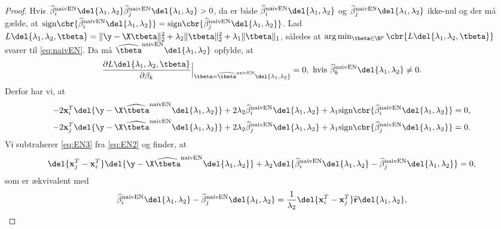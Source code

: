 %
\begin{proof}
Hvis \(\widehat{\beta}^\text{naivEN}_i \del{\lambda_1, \lambda_2} \widehat{\beta}^\text{naivEN}_j \del{\lambda_1, \lambda_2} > 0\), da er både \(\widehat{\beta}^\text{naivEN}_i \del{\lambda_1, \lambda_2}\) og \(\widehat{\beta}^\text{naivEN}_j \del{\lambda_1, \lambda_2}\) ikke-nul og der må gælde, at \(\text{sign} \cbr{\widehat{\beta}^\text{naivEN}_i \del{\lambda_1, \lambda_2}} = \text{sign} \cbr{\widehat{\beta}^\text{naivEN}_j \del{\lambda_1, \lambda_2}}\).
Lad \(L \del{\lambda_1,\lambda_2, \tbeta} = \Vert \y - \X \tbeta \Vert_2^2 + \lambda_2 \Vert \tbeta \Vert_2^2 + \lambda_1 \Vert \tbeta \Vert_1\), således at \(\arg \min_{\tbeta \in \R^p} \cbr{L \del{\lambda_1,\lambda_2, \tbeta}}\) svarer til \eqref{eq:naivEN}.
Da må \(\widehat{\tbeta}^\text{naivEN} \del{\lambda_1, \lambda_2}\) opfylde, at
\begin{align*}
\frac{\partial L \del{\lambda_1,\lambda_2, \tbeta} }{\partial \beta_k} \Bigr|_{\tbeta = \widehat{\tbeta}^\text{naivEN} \del{\lambda_1, \lambda_2}}=0, \text{ hvis } \widehat{\beta}^\text{naivEN}_k \del{\lambda_1, \lambda_2} \neq 0.
\end{align*}
Derfor har vi, at
\begin{align}
-2 \mathbf{x}_i^T \del{\y - \X \widehat{\tbeta}^\text{naivEN} \del{\lambda_1, \lambda_2}} +  2 \lambda_2 \widehat{\beta}^\text{naivEN}_i \del{\lambda_1, \lambda_2} + \lambda_1 \text{sign} \cbr{\widehat{\beta}^\text{naivEN}_i \del{\lambda_1, \lambda_2}} &= 0, \label{eq:EN2}\\
-2 \mathbf{x}_j^T \del{\y - \X \widehat{\tbeta}^\text{naivEN} \del{\lambda_1, \lambda_2}} + 2 \lambda_2 \widehat{\beta}^\text{naivEN}_j \del{\lambda_1, \lambda_2} + \lambda_1 \text{sign} \cbr{\widehat{\beta}^\text{naivEN}_j \del{\lambda_1, \lambda_2}} &= 0. \label{eq:EN3}
\end{align}
Vi subtraherer \eqref{eq:EN3} fra \eqref{eq:EN2} og finder, at
\begin{align*}
\del{\mathbf{x}_j^T-\mathbf{x}_i^T} \del{\y - \X \widehat{\tbeta}^\text{naivEN} \del{\lambda_1, \lambda_2}} + \lambda_2 \del{\widehat{\beta}^\text{naivEN}_i \del{\lambda_1, \lambda_2} - \widehat{\beta}^\text{naivEN}_j \del{\lambda_1, \lambda_2}} =0,
\end{align*}
som er ækvivalent med
\begin{align}
\widehat{\beta}^\text{naivEN}_i \del{\lambda_1, \lambda_2} - \widehat{\beta}^\text{naivEN}_j \del{\lambda_1, \lambda_2} = \frac{1}{\lambda_2} \del{\mathbf{x}_i^T-\mathbf{x}_j^T} \widehat{\mathbf{r}}\del{\lambda_1, \lambda_2}, \label{eq:EN4}

\end{align}
\end{proof}
